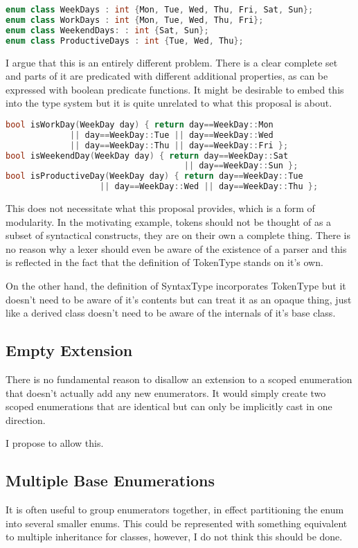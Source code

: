 \documentclass{scrartcl}
\begin{document}
\begin{lstlisting}[language=C++]
enum class WeekDays : int {Mon, Tue, Wed, Thu, Fri, Sat, Sun};
enum class WorkDays : int {Mon, Tue, Wed, Thu, Fri};
enum class WeekendDays: : int {Sat, Sun};
enum class ProductiveDays : int {Tue, Wed, Thu};
\end{lstlisting}

\noindent
I argue that this is an entirely different problem.
There is a clear complete set and parts of it are predicated with different additional properties, as can be expressed
with boolean predicate functions.
It might be desirable to embed this into the type system but it is quite unrelated to what this proposal is about.

\begin{lstlisting}[language=C++]
bool isWorkDay(WeekDay day) { return day==WeekDay::Mon
             || day==WeekDay::Tue || day==WeekDay::Wed
             || day==WeekDay::Thu || day==WeekDay::Fri };
bool isWeekendDay(WeekDay day) { return day==WeekDay::Sat
                                    || day==WeekDay::Sun };
bool isProductiveDay(WeekDay day) { return day==WeekDay::Tue
                   || day==WeekDay::Wed || day==WeekDay::Thu };
\end{lstlisting}

\noindent
This does not necessitate what this proposal provides, which is a form of modularity.
In the motivating example, tokens should not be thought of as a subset of syntactical constructs, they are on their own
a complete thing.
There is no reason why a lexer should even be aware of the existence of a parser and this is reflected in the fact that
the definition of TokenType stands on it's own.

On the other hand, the definition of SyntaxType incorporates TokenType but it doesn't need to be aware of it's contents
but can treat it as an opaque thing, just like a derived class doesn't need to be aware of the internals of it's base
class.

\subsection{Empty Extension}
There is no fundamental reason to disallow an extension to a scoped enumeration that doesn't actually add any new enumerators.
It would simply create two scoped enumerations that are identical but can only be implicitly cast in one direction.

I propose to allow this.

\subsection{Multiple Base Enumerations}
It is often useful to group enumerators together, in effect partitioning the
enum into several smaller enums.
This could be represented with something equivalent to multiple inheritance for
classes, however, I do not think this should be done.
\end{document}
